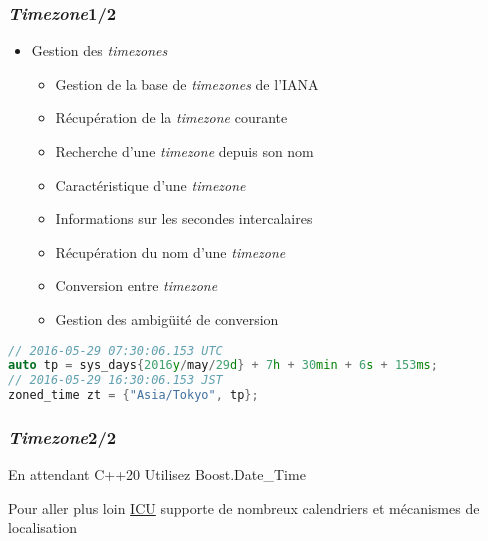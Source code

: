 \documentclass[C++.tex]{subfiles}
\begin{document}
\begin{frame}[fragile]
	\frametitle{\textit{Timezone}\titlehfill{}1/2}
	\begin{itemize}
		\item Gestion des \textit{timezones}
		\begin{itemize}
			\item Gestion de la base de \textit{timezones} de l'IANA


			\item Récupération de la \textit{timezone} courante
			\item Recherche d'une \textit{timezone} depuis son nom
			\item Caractéristique d'une \textit{timezone}
			\item Informations sur les secondes intercalaires
			\item Récupération du nom d'une \textit{timezone}
			\item Conversion entre \textit{timezone}
			\item Gestion des ambigüité de conversion
		\end{itemize}
	\end{itemize}

	\begin{lstlisting}[language=C++]
// 2016-05-29 07:30:06.153 UTC
auto tp = sys_days{2016y/may/29d} + 7h + 30min + 6s + 153ms; 
// 2016-05-29 16:30:06.153 JST
zoned_time zt = {"Asia/Tokyo", tp};\end{lstlisting}
\end{frame}

\begin{frame}[fragile]
	\frametitle{\textit{Timezone}\titlehfill{}2/2}
	\begin{block}{En attendant C++20}
		Utilisez Boost.Date\_Time
	\end{block}

	\begin{block}{Pour aller plus loin}
		\href{http://site.icu-project.org/home}{ICU} supporte de nombreux calendriers et mécanismes de localisation

	\end{block}
\end{frame}
\end{document}
